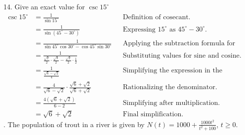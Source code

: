 \documentclass{article}
\newenvironment{solution}{\color{solutioncolor}}{}
\begin{document}
14. Give an exact value for \( \csc 15^{\circ} \)
\begin{solution}
\begin{align*}
    \csc 15^{\circ} &= \frac{1}{\sin 15^{\circ}} && \text{Definition of cosecant.} \\
    &= \frac{1}{\sin(45^{\circ} - 30^{\circ})} && \text{Expressing \(15^{\circ}\) as \(45^{\circ} - 30^{\circ}\).} \\
    &= \frac{1}{\sin 45^{\circ} \cos 30^{\circ} - \cos 45^{\circ} \sin 30^{\circ}} && \text{Applying the subtraction formula for sine.} \\
    &= \frac{1}{\frac{\sqrt{2}}{2} \cdot \frac{\sqrt{3}}{2} - \frac{\sqrt{2}}{2} \cdot \frac{1}{2}} && \text{Substituting values for sine and cosine.} \\
    &= \frac{1}{\frac{\sqrt{6} - \sqrt{2}}{4}} && \text{Simplifying the expression in the denominator.} \\
    &= \frac{4}{\sqrt{6} - \sqrt{2}} \cdot \frac{\sqrt{6} + \sqrt{2}}{\sqrt{6} + \sqrt{2}} && \text{Rationalizing the denominator.} \\
    &= \frac{4(\sqrt{6} + \sqrt{2})}{6 - 2} && \text{Simplifying after multiplication.} \\
    &= \sqrt{6} + \sqrt{2} && \text{Final simplification.}
\end{align*}
\end{solution}
. The population of trout in a river is given by \( N(t) = 1000 + \frac{1000t^2}{t^2 + 100} \), \( t \geq 0 \).
\end{document}
